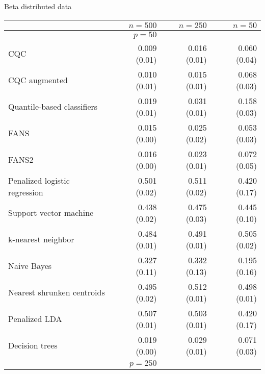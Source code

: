 \begin{table}[p]
  \centering
  Beta distributed data \\[2ex]
  \begin{adjustbox}{max size={\textwidth}{10cm}}
    \begin{tabular}{l@{\extracolsep{15mm}}rrr}
      
      \hline
      & $n=500$ & $n=250$ & $n=50$ \\ 
      \hline
      & $p = 50$ \\
      \hline

      CQC & 0.009 (0.01) & 0.016 (0.01) & 0.060 (0.04) \\ 
      CQC augmented & 0.010 (0.01) & 0.015 (0.01) & 0.068 (0.03) \\ 
      Quantile-based classifiers & 0.019 (0.01) & 0.031 (0.01) & 0.158 (0.03) \\ 
      FANS  & 0.015 (0.00) & 0.025 (0.02) & 0.053 (0.03) \\
      FANS2 & 0.016 (0.00) & 0.023 (0.01) & 0.072 (0.05) \\
      Penalized logistic regression & 0.501 (0.02) & 0.511 (0.02) & 0.420 (0.17) \\ 
      Support vector machine & 0.438 (0.02) & 0.475 (0.03) & 0.445 (0.10) \\ 
      k-nearest neighbor & 0.484 (0.01) & 0.491 (0.01) & 0.505 (0.02) \\ 
      Naive Bayes & 0.327 (0.11) & 0.332 (0.13) & 0.195 (0.16) \\ 
      Nearest shrunken centroids & 0.495 (0.02) & 0.512 (0.01) & 0.498 (0.01) \\ 
      Penalized LDA & 0.507 (0.01) & 0.503 (0.01) & 0.420 (0.17) \\ 
      Decision trees & 0.019 (0.00) & 0.029 (0.01) & 0.071 (0.03) \\ [2ex]

      \hline
      & $p = 250$ \\
      \hline


\end{tabular}
\end{adjustbox}
\end{table}
